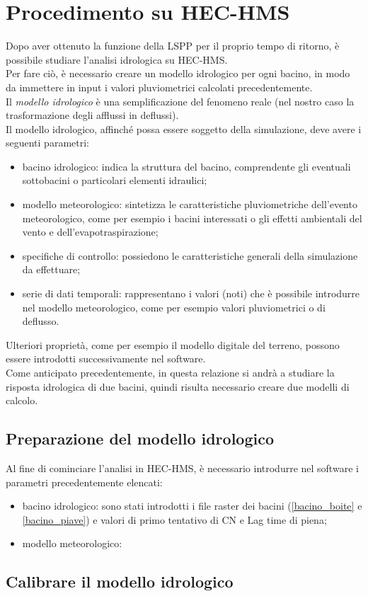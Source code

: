 \section{Procedimento su HEC-HMS}
Dopo aver ottenuto la funzione della LSPP per il proprio tempo di ritorno, è possibile studiare l'analisi idrologica su HEC-HMS.\\
Per fare ciò, è necessario creare un modello idrologico per ogni bacino, in modo da immettere in input i valori pluviometrici calcolati precedentemente.\\
Il \textit{modello idrologico} è una semplificazione del fenomeno reale (nel nostro caso la trasformazione degli afflussi in deflussi).\\
Il modello idrologico, affinché possa essere soggetto della simulazione, deve avere i seguenti parametri:
\begin{itemize}
    \item bacino idrologico: indica la struttura del bacino, comprendente gli eventuali sottobacini o particolari elementi idraulici;
    \item modello meteorologico: sintetizza le caratteristiche pluviometriche dell'evento meteorologico, come per esempio i bacini interessati o gli effetti ambientali del vento e dell'evapotraspirazione;
    \item specifiche di controllo: possiedono le caratteristiche generali della simulazione da effettuare;
    \item serie di dati temporali: rappresentano i valori (noti) che è possibile introdurre nel modello meteorologico, come per esempio valori pluviometrici o di deflusso.
\end{itemize}
 Ulteriori proprietà, come per esempio il modello digitale del terreno, possono essere introdotti successivamente nel software.\\
 Come anticipato precedentemente, in questa relazione si andrà a studiare la risposta idrologica di due bacini, quindi risulta necessario creare due modelli di calcolo.

 \subsection{Preparazione del modello idrologico}
 Al fine di cominciare l'analisi in HEC-HMS, è necessario introdurre nel software i parametri precedentemente elencati:
 \begin{itemize}
    \item bacino idrologico: sono stati introdotti i file raster dei bacini (\ref{bacino_boite} e \ref{bacino_piave}) e valori di primo tentativo di CN e Lag time di piena;
    \item modello meteorologico: 
 \end{itemize}
 
 \subsection{Calibrare il modello idrologico}
 